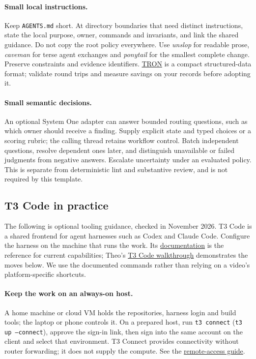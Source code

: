 \paragraph{Small local instructions.} Keep \texttt{AGENTS.md} short. At directory boundaries that need distinct instructions, state the local purpose, owner, commands and invariants, and link the shared guidance. Do not copy the root policy everywhere. Use \emph{unslop} for readable prose, \emph{caveman} for terse agent exchanges and \emph{ponytail} for the smallest complete change. Preserve constraints and evidence identifiers. \href{https://github.com/tron-format/tron-javascript}{TRON} is a compact structured-data format; validate round trips and measure savings on your records before adopting it.

\paragraph{Small semantic decisions.} An optional System One adapter can answer bounded routing questions, such as which owner should receive a finding. Supply explicit state and typed choices or a scoring rubric; the calling thread retains workflow control. Batch independent questions, resolve dependent ones later, and distinguish unavailable or failed judgments from negative answers. Escalate uncertainty under an evaluated policy. This is separate from deterministic lint and substantive review, and is not required by this template.

\subsection{T3 Code in practice}\label{guide:code:t3}
The following is optional tooling guidance, checked in November 2026. T3 Code is a shared frontend for agent harnesses such as Codex and Claude Code. Configure the harness on the machine that runs the work. Its \href{https://github.com/pingdotgg/t3code}{documentation} is the reference for current capabilities; Theo's \href{https://www.youtube.com/watch?v=uLGxb4F3SyI}{T3 Code walkthrough} demonstrates the moves below. We use the documented commands rather than relying on a video's platform-specific shortcuts.

\paragraph{Keep the work on an always-on host.} A home machine or cloud VM holds the repositories, harness login and build tools; the laptop or phone controls it. On a prepared host, run \texttt{t3 connect} (\texttt{t3 up --connect}), approve the sign-in link, then sign into the same account on the client and select that environment. T3 Connect provides connectivity without router forwarding; it does not supply the compute. See the \href{https://github.com/pingdotgg/t3code/blob/main/docs/user/remote-access.md}{remote-access guide}.

